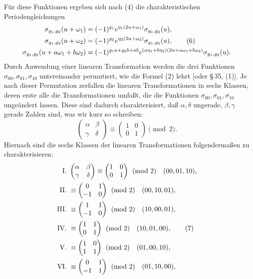 \documentclass[11pt]{article}
\begin{document}
Für diese Funktionen ergeben sich nach (4) die charakteristischen Periodengleichungen
\begin{align}
\sigma_{g_1,g_2}(u+\omega_1)&=(-1)^{g_1}e^{\eta_1(2u+
\omega_1)}\sigma_{g_1,g_2}(u),\notag\\
\sigma_{g_1,g_2}(u+\omega_2)&=(-1)^{g_2}e^{\eta_2(2u+
\omega_2)}\sigma_{g_1,g_2}(u), \tag{6}\\
\sigma_{g_1,g_2}(u+a\omega_1+b\omega_2)&=(-1)^{g_1a+g_2b+ab}e^{(a\eta_1+b\eta_2)(2u+a\omega_1+b\omega_2)}\sigma_{g_1,g_2}(u).\notag
\end{align}
Durch Anwendung einer linearen Transformation werden die drei Funktionen $\sigma_{00},\sigma_{01},\sigma_{10}$ untereinander permutiert, wie die Formel (2) lehrt [oder \S\,35, (1)]. Je nach dieser Permutation zerfallen die linearen Transformationen in sechs Klassen, deren erste alle die Transformationen umfaßt, die die Funktionen $\sigma_{00},\sigma_{01},\sigma_{10}$ ungeändert lassen. Diese sind dadurch charakterisiert, daß $\alpha,\delta$ ungerade, $\beta,\gamma$ gerade Zahlen sind, was wir kurz so schreiben:
\[
\begin{pmatrix}\alpha&\beta\\\gamma&\delta\end{pmatrix}\equiv
\begin{pmatrix}1&0\\0&1\end{pmatrix}\pmod2.
\]
Hiernach sind die sechs Klassen der linearen Transformationen folgendermaßen zu charakterisieren:
\begin{align}
\text{I. }&\begin{pmatrix}\alpha&\beta\\\gamma&\delta\end{pmatrix}\equiv
\begin{pmatrix}1&0\\0&1\end{pmatrix}\pmod2\quad (00,01,10),\notag\\
\text{II. }&\equiv\begin{pmatrix}0&1\\-1&0\end{pmatrix}\pmod2\quad (00,10,01),\notag\\
\text{III. }&\equiv\begin{pmatrix}1&1\\-1&0\end{pmatrix}\pmod2\quad (10,00,01),\notag\\
\text{IV. }&\equiv\begin{pmatrix}1&1\\0&1\end{pmatrix}\pmod2\quad (10,01,00), \tag{7}\\
\text{V. }&\equiv\begin{pmatrix}1&0\\1&1\end{pmatrix}\pmod2\quad (01,00,10),\notag\\
\text{VI. }&\equiv\begin{pmatrix}0&1\\-1&1\end{pmatrix}\pmod2\quad (01,10,00),\notag
\end{align}
\end{document}

